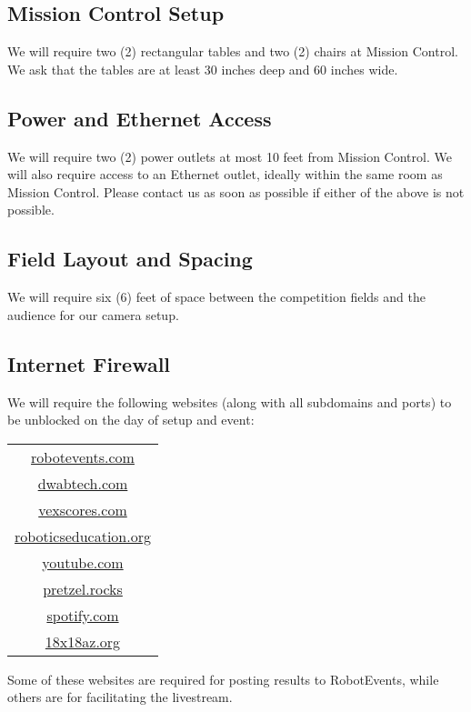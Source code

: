 \documentclass[12pt]{article}
\begin{document}
\subsection{Mission Control Setup}
We will require two (2) rectangular tables and two (2) chairs at Mission Control.
We ask that the tables are at least 30 inches deep and 60 inches wide.

\subsection{Power and Ethernet Access}
We will require two (2) power outlets at most 10 feet from Mission Control.
We will also require access to an Ethernet outlet, ideally within the same room as Mission Control.
Please contact us as soon as possible if either of the above is not possible.

\subsection{Field Layout and Spacing}
We will require six (6) feet of space between the competition fields and the audience for our camera setup.

\subsection{Internet Firewall}
We will require the following websites (along with all subdomains and ports) to be unblocked on the day of setup and event:

\begin{centering}

\begin{tabular}{|c|}
    \hline
    \url{robotevents.com} \\
    \url{dwabtech.com} \\
    \url{vexscores.com} \\
    \url{roboticseducation.org}\\
    \url{youtube.com}\\ 
        \url{pretzel.rocks} \\
        \url{spotify.com}\\
        \url{18x18az.org} \\
    \hline
\end{tabular}

\end{centering}
\vspace{1em}

\noindent Some of these websites are required for posting results to RobotEvents, while others are for facilitating the livestream.
\end{document}
